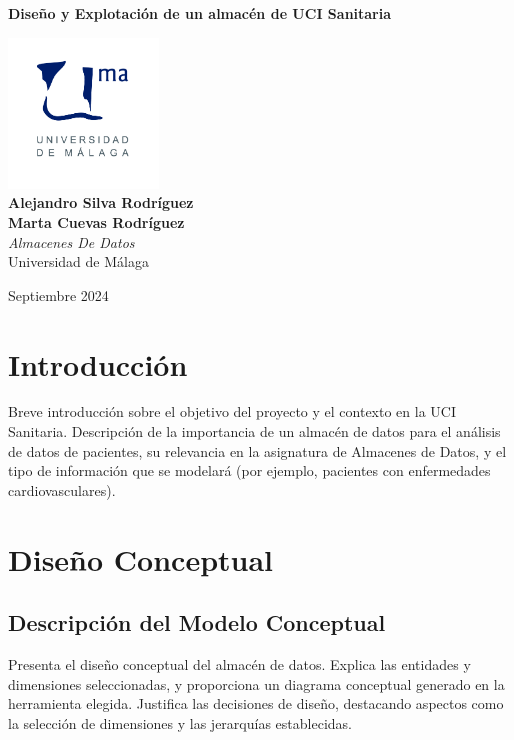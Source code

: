 \documentclass{article}
\begin{document}
\begin{titlepage}
	\centering
	\vspace*{3cm}
	
	{\Huge \textbf{Diseño y Explotación de un almacén de 
			UCI Sanitaria}\\[0.5cm]}
	
	\vspace{2cm}
	\includegraphics[width=0.3\textwidth]{images/uma_logo.jpg}\\[1cm]
	
	{\LARGE \textbf{Alejandro Silva Rodríguez}\\[0.5cm]}
	{\LARGE \textbf{Marta Cuevas Rodríguez}\\[0.5cm]}
	{\large \textit{Almacenes De Datos}\\
		Universidad de Málaga\\
		}
	
	\vfill
	
	{\large Septiembre 2024}
\end{titlepage}

\tableofcontents

\newpage
\section{Introducción}
\label{sec:introduccion}
Breve introducción sobre el objetivo del proyecto y el contexto en la UCI Sanitaria. Descripción de la importancia de un almacén de datos para el análisis de datos de pacientes, su relevancia en la asignatura de Almacenes de Datos, y el tipo de información que se modelará (por ejemplo, pacientes con enfermedades cardiovasculares).

\section{Diseño Conceptual}
\label{sec:diseno_conceptual}
\subsection{Descripción del Modelo Conceptual}
Presenta el diseño conceptual del almacén de datos. Explica las entidades y dimensiones seleccionadas, y proporciona un diagrama conceptual generado en la herramienta elegida. Justifica las decisiones de diseño, destacando aspectos como la selección de dimensiones y las jerarquías establecidas.
\end{document}
